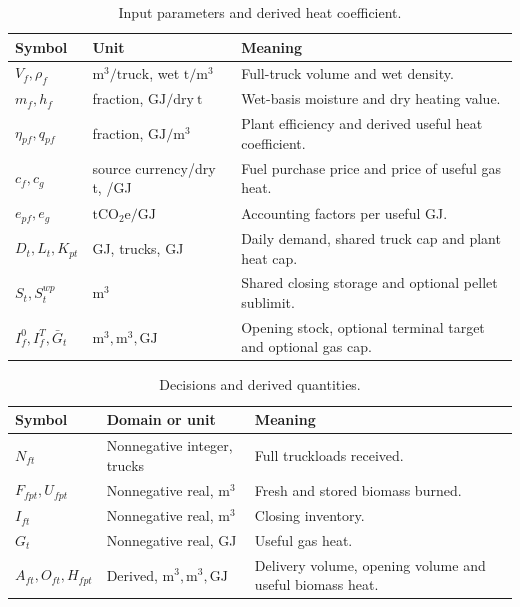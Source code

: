 \documentclass[11pt,a4paper]{article}
\begin{document}
\begin{table}[htbp]
\small
\caption{Input parameters and derived heat coefficient.}
\label{tab:params}
\begin{tabularx}{\textwidth}{@{}llY@{}}
\toprule Symbol & Unit & Meaning \\ \midrule
\(V_f,\rho_f\) & \(\mathrm{m^3/truck}\), wet \(\mathrm{t/m^3}\) & Full-truck volume and wet density.\\
\(m_f,h_f\) & fraction, \(\mathrm{GJ/dry\ t}\) & Wet-basis moisture and dry heating value.\\
\(\eta_{pf},q_{pf}\) & fraction, \(\mathrm{GJ/m^3}\) & Plant efficiency and derived useful heat coefficient.\\
\(c_f,c_g\) & source currency/dry t, /GJ & Fuel purchase price and price of useful gas heat.\\
\(e_{pf},e_g\) & \(\mathrm{tCO_2e/GJ}\) & Accounting factors per useful GJ.\\
\(D_t,L_t,K_{pt}\) & GJ, trucks, GJ & Daily demand, shared truck cap and plant heat cap.\\
\(S_t,S^{wp}_t\) & \(\mathrm{m^3}\) & Shared closing storage and optional pellet sublimit.\\
\(I_f^0,I_f^T,\bar G_t\) & \(\mathrm{m^3},\mathrm{m^3},\mathrm{GJ}\) & Opening stock, optional terminal target and optional gas cap.\\
\bottomrule
\end{tabularx}
\end{table}
\begin{table}[htbp]
\small
\caption{Decisions and derived quantities.}
\label{tab:vars}
\begin{tabularx}{\textwidth}{@{}llY@{}}
\toprule Symbol & Domain or unit & Meaning\\ \midrule
\(N_{ft}\) & Nonnegative integer, trucks & Full truckloads received.\\
\(F_{fpt},U_{fpt}\) & Nonnegative real, \(\mathrm{m^3}\) & Fresh and stored biomass burned.\\
\(I_{ft}\) & Nonnegative real, \(\mathrm{m^3}\) & Closing inventory.\\
\(G_t\) & Nonnegative real, GJ & Useful gas heat.\\
\(A_{ft},O_{ft},H_{fpt}\) & Derived, \(\mathrm{m^3},\mathrm{m^3},\mathrm{GJ}\) & Delivery volume, opening volume and useful biomass heat.\\
\bottomrule
\end{tabularx}
\end{table}
\end{document}
